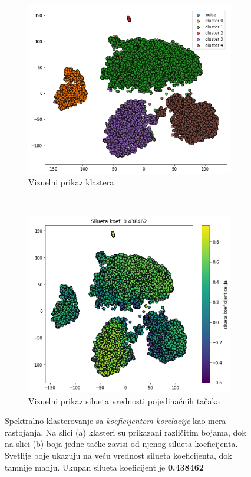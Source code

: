 \documentclass[a4paper]{article}
\begin{document}
\begin{figure}[H]
	\centering
	
	\begin{subfigure}[normla]{0.5\textwidth}
		\includegraphics[scale=0.3]{spektral_nmf_grp1_korelacija}
		
		\caption{Vizuelni prikaz klastera}
		\label{spektral_nmf_grp1_korelacija_A}

	\end{subfigure}
	~
	\begin{subfigure}[normla]{0.4\textwidth}
		\includegraphics[scale=0.3]{spektral_nmf_grp1_korelacija_silueta}
		\caption{Vizuelni prikaz silueta vrednosti pojedinačnih tačaka}
		\label{spektral_nmf_grp1_korelacija_B}
	\end{subfigure}
	\caption{Spektralno klasterovanje sa \textit{koeficijentom korelacije} kao mera rastojanja. Na slici (a) klasteri su prikazani različitim bojama, dok na slici (b) boja jedne tačke zavisi od njenog silueta koeficijenta. Svetlije boje ukazuju na veću vrednost silueta koeficijenta, dok tamnije manju. Ukupan silueta koeficijent je \textbf{0.438462}}
\label{spektral_nmf_grp1_korelacija}
\end{figure}
\end{document}
